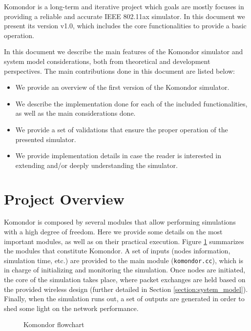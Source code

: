 \documentclass[a4paper]{article}
\begin{document}
Komondor is a long-term and iterative project which goals are mostly focuses in providing a reliable and accurate IEEE 802.11ax simulator. In this document we present its version v1.0, which includes the core functionalities to provide a basic operation.
	
In this document we describe the main features of the Komondor simulator and system model considerations, both from theoretical and development perspectives. The main contributions done in this document are listed below:
\begin{itemize}
	\item We provide an overview of the first version of the Komondor simulator.
	\item We describe the implementation done for each of the included functionalities, as well as the main considerations done.
	\item We provide a set of validations that ensure the proper operation of the presented simulator.
	\item We provide implementation details in case the reader is interested in extending and/or deeply understanding the simulator.
\end{itemize}	
	
\section{Project Overview}
\label{section:project_overview}

Komondor is composed by several modules that allow performing simulations with a high degree of freedom. Here we provide some details on the most important modules, as well as on their practical execution. Figure \ref{fig:komondor_flowchart} summarizes the modules that constitute Komondor. A set of inputs (nodes information, simulation time, etc.) are provided to the main module (\texttt{komondor.cc}), which is in charge of initializing and monitoring the simulation. Once nodes are initiated, the core of the simulation takes place, where packet exchanges are held based on the provided wireless design (further detailed in Section \ref{section:system_model}). Finally, when the simulation runs out, a set of outputs are generated in order to shed some light on the network performance.
\begin{figure}[h!]
	\centering
	\caption{Komondor flowchart}
	\label{fig:komondor_flowchart}
\end{figure}		
\end{document}
